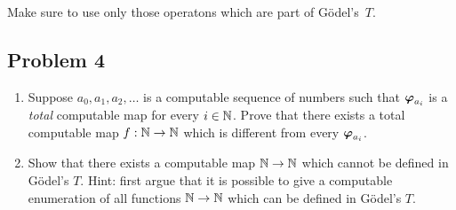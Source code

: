 \documentclass[a4paper,11pt]{article}
\begin{document}
Make sure to use only those operatons which are part of G\"odel's~$T$.

\subsection*{Problem 4}

\begin{enumerate}
\item 
  Suppose $a_0, a_1, a_2, \ldots$ is a computable sequence of numbers
  such that $\text{\boldmath{$\varphi$}}_{a_i}$ is a \emph{total} computable map for every $i
  \in \mathbb{N}$. Prove that there exists a total computable map $f : \mathbb{N}
  \to \mathbb{N}$ which is different from every $\text{\boldmath{$\varphi$}}_{a_i}$.
\item 
  Show that there exists a computable map $\mathbb{N} \to \mathbb{N}$ which cannot
  be defined in G\"odel's $T$. Hint: first argue that it is possible
  to give a computable enumeration of all functions $\mathbb{N} \to \mathbb{N}$
  which can be defined in G\"odel's $T$.
\end{enumerate}
\end{document}
